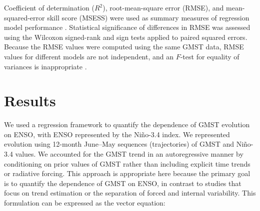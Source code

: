 \documentclass[draft]{agujournal2019}
\begin{document}
Coefficient of determination ($R^2$), root-mean-square error (RMSE), and mean-squared-error skill score (MSESS) were used as summary measures of regression model performance \cite{Wilks2011}. Statistical significance of differences in RMSE was assessed using the Wilcoxon signed-rank and sign tests applied to paired squared errors. Because the RMSE values were computed using the same GMST data, RMSE values for different models are not independent, and an $F$-test for equality of variances is inappropriate \cite{TDS:Comparing:2014}.

\section{Results}\label{sec:results}

We used a regression framework to quantify the dependence of GMST evolution on ENSO, with ENSO represented by the Ni\~no-3.4 index. We represented evolution using 12-month June--May sequences (trajectories) of GMST and Ni\~no-3.4 values. We accounted for the GMST trend in an autoregressive manner by conditioning on prior values of GMST rather than including explicit time trends or radiative forcing. This approach is appropriate here because the primary goal is to quantify the dependence of GMST on ENSO, in contrast to studies that focus on trend estimation or the separation of forced and internal variability. This formulation can be expressed as the vector equation:
\end{document}
